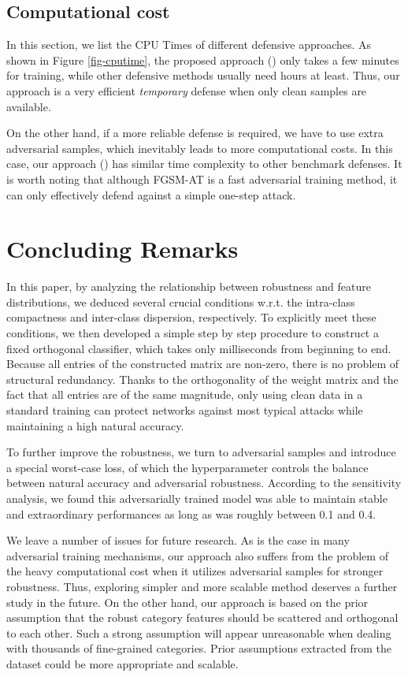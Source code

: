 \documentclass[preprint,review,12pt]{elsarticle}
\numberwithin{equation}{section}
\begin{document}
\subsection{Computational cost}
In this section, we list the CPU Times of different defensive approaches.
As shown in Figure \ref{fig-cputime},
the proposed approach () only takes a few minutes for training,
while other defensive methods usually need hours at least.
Thus, our approach is a very efficient \textit{temporary} defense when only clean samples are available.

On the other hand, if a more reliable defense is required,
we have to use extra adversarial samples, which inevitably leads to more computational costs.
In this case, our approach  () has similar time complexity to other benchmark defenses.
It is worth noting that although FGSM-AT is a fast adversarial training method,
 it can only effectively defend against a simple one-step attack.



\section{Concluding Remarks}

In this paper, by analyzing the relationship between robustness and feature distributions,
we deduced several crucial  conditions w.r.t. the intra-class compactness and inter-class dispersion, respectively.
To explicitly meet these conditions,
we then developed a simple step by step procedure to construct a fixed orthogonal classifier,
which takes only milliseconds from beginning to end.
Because all entries of the constructed matrix are non-zero, there is no problem of structural redundancy.
Thanks to the orthogonality of the weight matrix and the fact that all entries are of the same magnitude,
only using clean data in a standard training can protect networks against most typical attacks while maintaining a high natural accuracy.

To further improve the robustness, we turn to adversarial samples and introduce a special worst-case loss,
of which the hyperparameter  controls the balance between natural accuracy and adversarial robustness.
According to the sensitivity analysis, we found this adversarially trained model was able to maintain stable and extraordinary performances
as long as  was roughly between 0.1 and 0.4.

We leave a number of issues for future research.
As is the case in many adversarial training mechanisms,
our approach also suffers from the problem of the heavy computational cost
when it utilizes adversarial samples for stronger robustness.
Thus, exploring simpler and more scalable method deserves a further study in the future.
On the other hand, our approach is based on the prior assumption that
the robust category features should be scattered  and  orthogonal to each other.
Such a strong assumption will appear unreasonable when dealing with thousands of fine-grained categories.
Prior assumptions extracted from the dataset could be more appropriate and scalable.
\end{document}
